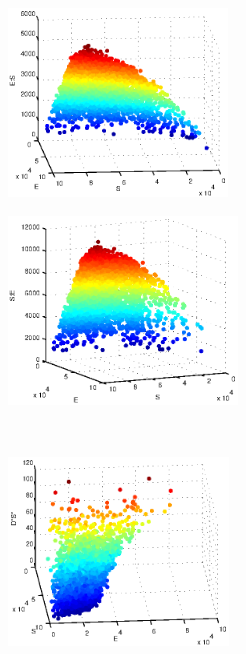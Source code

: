 \begin{figure}[t]
\centering
\begin{subfigure}{0.45\textwidth}
\includegraphics[height=5cm]{rxn_manifold1}
\caption{}
\label{subfig:rxn_manifolds1}
\end{subfigure}
\begin{subfigure}{0.45\textwidth}
\includegraphics[height=5cm]{rxn_manifold2}
\caption{}
\label{subfig:rxn_manifolds2}
\end{subfigure}\\
\begin{subfigure}{0.45\textwidth}
\includegraphics[height=5cm]{rxn_manifold3}

\end{subfigure}
\end{figure}
